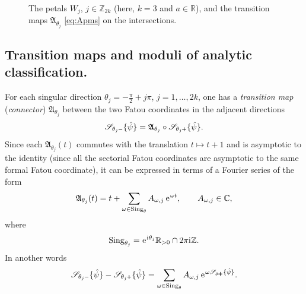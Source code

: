 \documentclass[a4paper,11pt]{amsart}
\numberwithin{equation}{section}
\newcommand{\C}{{\mathbb C}}
\newcommand{\Z}{{\mathbb Z}}
\newcommand{\R}{{\mathbb R}}
\renewcommand{\i}{\mathrm{i}\mkern.25\thinmuskip}
\newcommand{\e}{\ensuremath{\mkern.25\thinmuskip\mathrm{e}\mkern.4\thinmuskip}}
\newcommand{\Aa}{\mathfrak{A}}
\newcommand{\BSum}{\mathscr{S}}
\newcommand{\Sing}{\operatorname{Sing}}
\newcommand{\pls}{{\scalebox{0.7}{$\pmb{+}$}}}
\newcommand{\mns}{{\scalebox{0.7}{$\pmb{-}$}}}
\theoremstyle{definition}
\begin{document}
\begin{figure}[t]
\centering	
{}
\caption{The petals $W_j$, $j\in\Z_{2k}$ (here, $k=3$ and $a\in\R$), and the transition maps $\Aa_{\theta_j}$ \eqref{eq:Apms}  on the intersections.}
\label{figure:parabolic}
\end{figure} 



\subsection{Transition maps and moduli of analytic classification.}\label{sec:3.2}


For each singular direction $\theta_j=-\frac{\pi}{2}+j\pi$, $j=1,\ldots,2k$, one has a \emph{transition map} (\emph{connector}) $\Aa_{\theta_j}$ between the two Fatou coordinates in the adjacent directions
\begin{equation*}\label{eq:Apmsdefinition}
	\BSum_{\theta_j\mns}\{\hat\psi\}=\Aa_{\theta_j}\circ\BSum_{\theta_j\pls}\{\hat\psi\}.
\end{equation*}
Since each $\Aa_{\theta_j}(t)$ commutes with the translation $t\mapsto t+1$ and is asymptotic to the identity
(since all the sectorial Fatou coordinates are asymptotic to the same formal Fatou coordinate), 
it can be expressed in terms of a Fourier series of the form
\begin{equation}\label{eq:Apms}
	\Aa_{\theta_j}(t)=t+\sum_{\omega\in \Sing_\theta}A_{\omega,j}\, \e^{\omega t},\qquad A_{\omega,j}\in\C,
\end{equation}
where 
\[\Sing_{\theta_j}= \e^{\i\theta_j}\R_{>0}\cap2\pi\i \Z.\]
In another words
\begin{equation}\label{eq:A+-}
	 \BSum_{\theta_j\mns}\{\hat\psi\}-\BSum_{\theta_j\pls}\{\hat\psi\}=\sum_{\omega\in \Sing_\theta}A_{\omega,j}\, \e^{\omega \BSum_{\theta\pls}\{\hat\psi\}}.
\end{equation}
\end{document}
